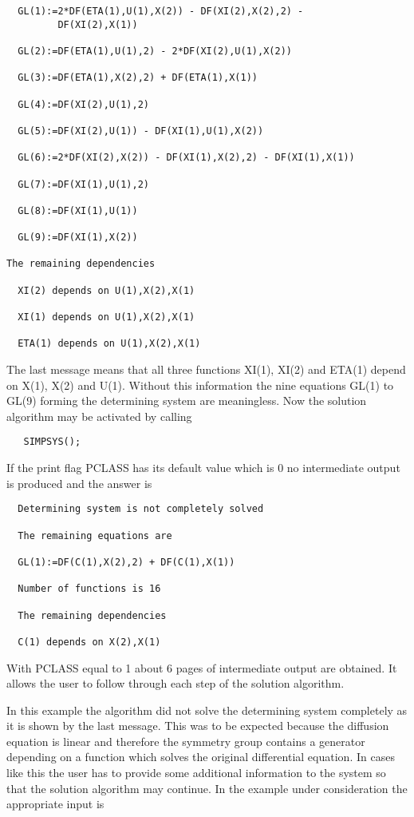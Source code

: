 \begin{verbatim}
  GL(1):=2*DF(ETA(1),U(1),X(2)) - DF(XI(2),X(2),2) -
         DF(XI(2),X(1))

  GL(2):=DF(ETA(1),U(1),2) - 2*DF(XI(2),U(1),X(2))

  GL(3):=DF(ETA(1),X(2),2) + DF(ETA(1),X(1))

  GL(4):=DF(XI(2),U(1),2)

  GL(5):=DF(XI(2),U(1)) - DF(XI(1),U(1),X(2))

  GL(6):=2*DF(XI(2),X(2)) - DF(XI(1),X(2),2) - DF(XI(1),X(1))

  GL(7):=DF(XI(1),U(1),2)

  GL(8):=DF(XI(1),U(1))

  GL(9):=DF(XI(1),X(2))

The remaining dependencies

  XI(2) depends on U(1),X(2),X(1)

  XI(1) depends on U(1),X(2),X(1)

  ETA(1) depends on U(1),X(2),X(1)
\end{verbatim}

The last message means that all three functions XI(1), XI(2) and
ETA(1) depend on X(1), X(2) and U(1). Without this information the
nine equations GL(1) to GL(9) forming the determining system are
meaningless. Now the solution algorithm may be activated by calling

\begin{verbatim}
   SIMPSYS();
\end{verbatim}

If the print flag PCLASS has its default value which is 0 no
intermediate output is produced and the answer is

\begin{verbatim}
  Determining system is not completely solved

  The remaining equations are

  GL(1):=DF(C(1),X(2),2) + DF(C(1),X(1))

  Number of functions is 16

  The remaining dependencies

  C(1) depends on X(2),X(1)
\end{verbatim}

With PCLASS equal to 1 about 6 pages of intermediate output are
obtained. It allows the user to follow through each step of the
solution algorithm.

In this example the algorithm did not solve the determining system
completely as it is shown by the last message. This was to be expected
because the diffusion equation is linear and therefore the symmetry
group contains a generator depending on a function which solves the
original differential equation. In cases like this the user has to
provide some additional information to the system so that the solution
algorithm may continue. In the example under consideration the
appropriate input is

